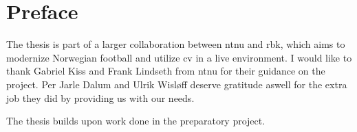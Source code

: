 \chapter*{Preface}

The thesis is part of a larger collaboration between \acrfull{ntnu} and \acrfull{rbk}, which aims to modernize Norwegian football and utilize \acrfull{cv} in a live environment. I would like to thank Gabriel Kiss and Frank Lindseth from \acrshort{ntnu} for their guidance on the project. Per Jarle Dalum and Ulrik Wisløff deserve gratitude aswell for the extra job they did by providing us with our needs. 

The thesis builds upon work done in the preparatory project. 